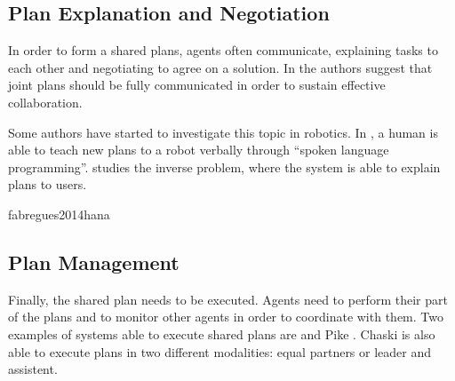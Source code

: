\subsection{Plan Explanation and Negotiation}
In order to form a shared plans, agents often communicate, explaining tasks to each other and negotiating to agree on a solution. In \cite{Lallee2013} the authors suggest that joint plans should be fully communicated in order to sustain effective collaboration. 

Some authors have started to investigate this topic in robotics. In \cite{Petit2012}, a human is able to teach new plans to a robot verbally through ``spoken language programming''. \cite{Sorce2015} studies the inverse problem, where the system is able to explain plans to users. 

fabregues2014hana

\subsection{Plan Management}
Finally, the shared plan needs to be executed. Agents need to perform their part of the plans and to monitor other agents in order to coordinate with them. Two examples of systems able to execute shared plans are  \cite{shah2011improved} and Pike \cite{karpas2015robust}. Chaski is also able to execute plans in two different modalities: equal partners or leader and assistent.



